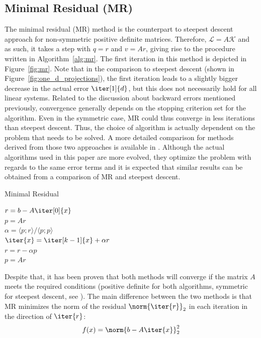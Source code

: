 \subsection{Minimal Residual (MR)}
\label{sec:mr}
The minimal residual (MR) method is the counterpart to steepest descent approach for non-symmetric positive definite matrices. Therefore, $\mathcal{L}=A\mathcal{K}$ and as such, it takes a step with $q=r$ and $v=Ar$, giving rise to the procedure written in Algorithm~\hyperref[alg:mr]{\ref{alg:mr}}. The first iteration in this method is depicted in Figure~\hyperref[fig:mr]{\ref{fig:mr}}. Note that in the comparison to steepest descent (shown in Figure~\hyperref[fig:one_d_projections]{\ref{fig:one_d_projections}}), the first iteration leads to a slightly bigger decrease in the actual error $\iter[1]{d}$, but this does not necessarily hold for all linear systems. Related to the discussion about backward errors mentioned previously, convergence generally depends on the stopping criterion set for the algorithm. Even in the symmetric case, MR could thus converge in less iterations than steepest descent. Thus, the choice of algorithm is actually dependent on the problem that needs to be solved. A more detailed comparison for methods derived from those two approaches is available in \cite{chin_cg_2012}. Although the actual algorithms used in this paper are more evolved, they optimize the problem with regards to the same error terms and it is expected that similar results can be obtained from a comparison of MR and steepest descent.
 

\begin{algorithm}[h]
  \caption{Minimal Residual}
  \label{alg:mr}
  \SetAlgoLined
  \DontPrintSemicolon
  $r = b-A\iter[0]{x}$ \\
  $p = Ar$ \\
   {
    $\alpha = \langle p;r \rangle / \langle p;p \rangle$ \\
    $\iter{x} = \iter[k-1]{x}+\alpha r$ \\
    $r = r - \alpha p$ \\
    $p = Ar$ \\
  }
\end{algorithm}

Despite that, it has been proven that both methods will converge if the matrix $A$ meets the required conditions (positive definite for both algorithms, symmetric for steepest descent, see \cite{saad_iterative_2003}). The main difference between the two methods is that MR minimizes the norm of the residual $\norm{\iter{r}}_2$ in each iteration in the direction of $\iter{r}$:
\begin{equation}
    f(x) = \norm{b-A\iter{x}}_2^2    
\end{equation}

